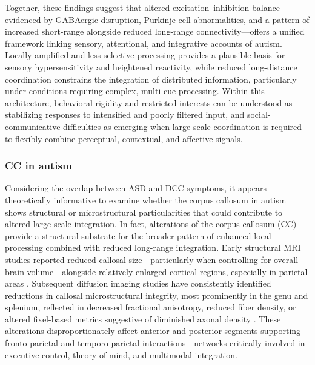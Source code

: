 \documentclass{article}
\begin{document}
Together, these findings suggest that altered excitation–inhibition balance—evidenced by GABAergic disruption, Purkinje cell abnormalities, and a pattern of increased short-range alongside reduced long-range connectivity—offers a unified framework linking sensory, attentional, and integrative accounts of autism. Locally amplified and less selective processing provides a plausible basis for sensory hypersensitivity and heightened reactivity, while reduced long-distance coordination constrains the integration of distributed information, particularly under conditions requiring complex, multi-cue processing. Within this architecture, behavioral rigidity and restricted interests can be understood as stabilizing responses to intensified and poorly filtered input, and social-communicative difficulties as emerging when large-scale coordination is required to flexibly combine perceptual, contextual, and affective signals.

\subsubsection{CC in autism}

Considering the overlap between ASD and DCC symptoms, it appears theoretically informative to examine whether the corpus callosum in autism shows structural or microstructural particularities that could contribute to altered large-scale integration. In fact, alterations of the corpus callosum (CC) provide a structural substrate for the broader pattern of enhanced local processing combined with reduced long-range integration. Early structural MRI studies reported reduced callosal size—particularly when controlling for overall brain volume—alongside relatively enlarged cortical regions, especially in parietal areas \citep{Piven1997}. Subsequent diffusion imaging studies have consistently identified reductions in callosal microstructural integrity, most prominently in the genu and splenium, reflected in decreased fractional anisotropy, reduced fiber density, or altered fixel-based metrics suggestive of diminished axonal density \citep{Just2007,Booth2011,Frazier2009,Dimond2019}. These alterations disproportionately affect anterior and posterior segments supporting fronto-parietal and temporo-parietal interactions—networks critically involved in executive control, theory of mind, and multimodal integration.
\end{document}
